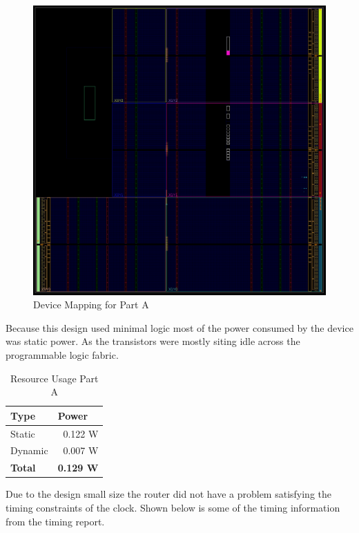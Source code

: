 \documentclass[letterpaper, 10 pt, conference]{IEEEconf}  %
\begin{document}
\begin{figure}[thpb]
   \centering
   \parbox{3in}{\centering\includegraphics[scale=0.35]{img/mp1a_device.PNG}}
   \caption{Device Mapping for Part A}
   \label{figurelabel}
\end{figure}

Because this design used minimal logic most of the power consumed by the device was static power. As the transistors were mostly siting idle across the programmable logic fabric.

\begin{table}[H]
\centering
\caption{Resource Usage Part A}
\label{table_example}
\begin{tabular}{|l|r|}
\hline
\rowcolor[HTML]{EFEFEF} 
Type    & \multicolumn{1}{l|}{\cellcolor[HTML]{EFEFEF}Power} \\ \hline
Static  & 0.122 W                                            \\ \hline
Dynamic & 0.007 W                                            \\ \hline
\textbf{Total} & \textbf{0.129 W}                            \\ \hline
\end{tabular}
\end{table}

Due to the design small size the router did not have a problem satisfying the timing constraints of the clock. Shown below is some of the timing information from the timing report.
\end{document}
